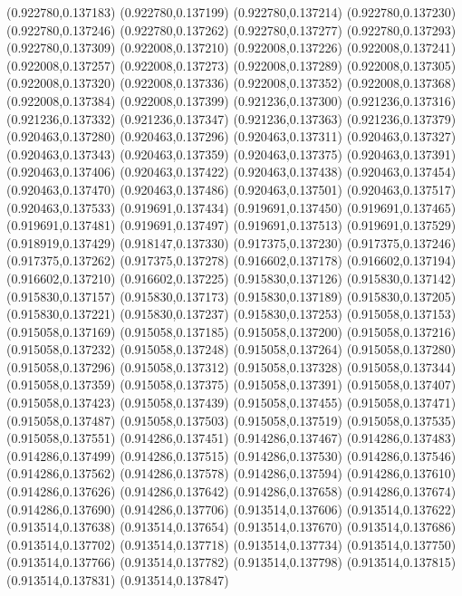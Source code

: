 (0.922780,0.137183)
(0.922780,0.137199)
(0.922780,0.137214)
(0.922780,0.137230)
(0.922780,0.137246)
(0.922780,0.137262)
(0.922780,0.137277)
(0.922780,0.137293)
(0.922780,0.137309)
(0.922008,0.137210)
(0.922008,0.137226)
(0.922008,0.137241)
(0.922008,0.137257)
(0.922008,0.137273)
(0.922008,0.137289)
(0.922008,0.137305)
(0.922008,0.137320)
(0.922008,0.137336)
(0.922008,0.137352)
(0.922008,0.137368)
(0.922008,0.137384)
(0.922008,0.137399)
(0.921236,0.137300)
(0.921236,0.137316)
(0.921236,0.137332)
(0.921236,0.137347)
(0.921236,0.137363)
(0.921236,0.137379)
(0.920463,0.137280)
(0.920463,0.137296)
(0.920463,0.137311)
(0.920463,0.137327)
(0.920463,0.137343)
(0.920463,0.137359)
(0.920463,0.137375)
(0.920463,0.137391)
(0.920463,0.137406)
(0.920463,0.137422)
(0.920463,0.137438)
(0.920463,0.137454)
(0.920463,0.137470)
(0.920463,0.137486)
(0.920463,0.137501)
(0.920463,0.137517)
(0.920463,0.137533)
(0.919691,0.137434)
(0.919691,0.137450)
(0.919691,0.137465)
(0.919691,0.137481)
(0.919691,0.137497)
(0.919691,0.137513)
(0.919691,0.137529)
(0.918919,0.137429)
(0.918147,0.137330)
(0.917375,0.137230)
(0.917375,0.137246)
(0.917375,0.137262)
(0.917375,0.137278)
(0.916602,0.137178)
(0.916602,0.137194)
(0.916602,0.137210)
(0.916602,0.137225)
(0.915830,0.137126)
(0.915830,0.137142)
(0.915830,0.137157)
(0.915830,0.137173)
(0.915830,0.137189)
(0.915830,0.137205)
(0.915830,0.137221)
(0.915830,0.137237)
(0.915830,0.137253)
(0.915058,0.137153)
(0.915058,0.137169)
(0.915058,0.137185)
(0.915058,0.137200)
(0.915058,0.137216)
(0.915058,0.137232)
(0.915058,0.137248)
(0.915058,0.137264)
(0.915058,0.137280)
(0.915058,0.137296)
(0.915058,0.137312)
(0.915058,0.137328)
(0.915058,0.137344)
(0.915058,0.137359)
(0.915058,0.137375)
(0.915058,0.137391)
(0.915058,0.137407)
(0.915058,0.137423)
(0.915058,0.137439)
(0.915058,0.137455)
(0.915058,0.137471)
(0.915058,0.137487)
(0.915058,0.137503)
(0.915058,0.137519)
(0.915058,0.137535)
(0.915058,0.137551)
(0.914286,0.137451)
(0.914286,0.137467)
(0.914286,0.137483)
(0.914286,0.137499)
(0.914286,0.137515)
(0.914286,0.137530)
(0.914286,0.137546)
(0.914286,0.137562)
(0.914286,0.137578)
(0.914286,0.137594)
(0.914286,0.137610)
(0.914286,0.137626)
(0.914286,0.137642)
(0.914286,0.137658)
(0.914286,0.137674)
(0.914286,0.137690)
(0.914286,0.137706)
(0.913514,0.137606)
(0.913514,0.137622)
(0.913514,0.137638)
(0.913514,0.137654)
(0.913514,0.137670)
(0.913514,0.137686)
(0.913514,0.137702)
(0.913514,0.137718)
(0.913514,0.137734)
(0.913514,0.137750)
(0.913514,0.137766)
(0.913514,0.137782)
(0.913514,0.137798)
(0.913514,0.137815)
(0.913514,0.137831)
(0.913514,0.137847)
